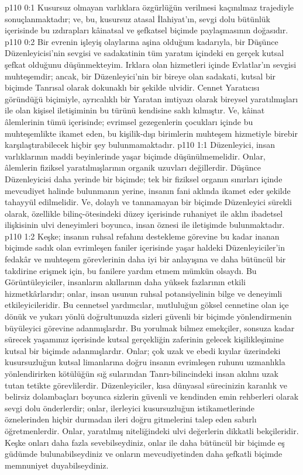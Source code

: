\vs p110 0:1 Kusursuz olmayan varlıklara özgürlüğün verilmesi kaçınılmaz trajediyle sonuçlanmaktadır; ve, bu, kusursuz atasal İlahiyat’ın, sevgi dolu bütünlük içerisinde bu ızdırapları kâinatsal ve şefkatsel biçimde paylaşmasının doğasıdır.
\vs p110 0:2 Bir evrenin işleyiş olaylarına aşina olduğum kadarıyla, bir Düşünce Düzenleyicisi’nin sevgisi ve sadakatinin tüm yaratım içindeki en gerçek kutsal şefkat olduğunu düşünmekteyim. Irklara olan hizmetleri içinde Evlatlar’ın sevgisi muhteşemdir; ancak, bir Düzenleyici’nin bir bireye olan sadakati, kutsal bir biçimde Tanrısal olarak dokunaklı bir şekilde ulvidir. Cennet Yaratıcısı göründüğü biçimiyle, ayrıcalıklı bir Yaratan imtiyazı olarak bireysel yaratılmışları ile olan kişisel iletişiminin bu türünü kendisine saklı kılmıştır. Ve, kâinat âlemlerinin tümü içerisinde; evrimsel gezegenlerin çocukları içinde bu muhteşemlikte ikamet eden, bu kişilik\hyp{}dışı birimlerin muhteşem hizmetiyle birebir karşılaştırabilecek hiçbir şey bulunmamaktadır.
\vs p110 1:1 Düzenleyici, insan varlıklarının maddi beyinlerinde yaşar biçimde düşünülmemelidir. Onlar, âlemlerin fiziksel yaratılmışlarının organik uzuvları değillerdir. Düşünce Düzenleyicisi daha yerinde bir biçimde; tek bir fiziksel organın sınırları içinde mevcudiyet halinde bulunmanın yerine, insanın fani aklında ikamet eder şekilde tahayyül edilmelidir. Ve, dolaylı ve tanınamayan bir biçimde Düzenleyici sürekli olarak, özellikle bilinç\hyp{}ötesindeki düzey içerisinde ruhaniyet ile aklın ibadetsel ilişkisinin ulvi deneyimleri boyunca, insan öznesi ile iletişimde bulunmaktadır.
\vs p110 1:2 Keşke; insanın ruhsal refahını destekleme görevine bu kadar inanan biçimde sadık olan evrimleşen faniler içerisinde yaşar haldeki Düzenleyiciler’in fedakâr ve muhteşem görevlerinin daha iyi bir anlayışına ve daha bütüncül bir takdirine erişmek için, bu fanilere yardım etmem mümkün olsaydı. Bu Görüntüleyiciler, insanların akıllarının daha yüksek fazlarının etkili hizmetkârlarıdır; onlar, insan usunun ruhsal potansiyelinin bilge ve deneyimli etkileyicileridir. Bu cennetsel yardımcılar, mutluluğun göksel cennetine olan içe dönük ve yukarı yönlü doğrultunuzda sizleri güvenli bir biçimde yönlendirmenin büyüleyici görevine adanmışlardır. Bu yorulmak bilmez emekçiler, sonsuza kadar sürecek yaşamınız içerisinde kutsal gerçekliğin zaferinin gelecek kişilikleşimine kutsal bir biçimde adanmışlardır. Onlar; çok uzak ve ebedi kıyılar üzerindeki kusursuzluğun kutsal limanlarına doğru insanın evrimleşen ruhunu uzmanlıkla yönlendirirken kötülüğün sığ sularından Tanrı\hyp{}bilincindeki insan akılını uzak tutan tetikte görevlilerdir. Düzenleyiciler, kısa dünyasal sürecinizin karanlık ve belirsiz dolambaçları boyunca sizlerin güvenli ve kendinden emin rehberleri olarak sevgi dolu önderlerdir; onlar, ilerleyici kusursuzluğun istikametlerinde öznelerinden hiçbir durmadan ileri doğru gitmelerini talep eden sabırlı öğretmenlerdir. Onlar, yaratılmış niteliğindeki ulvi değerlerin dikkatli bekçileridir. Keşke onları daha fazla sevebilseydiniz, onlar ile daha bütüncül bir biçimde eş güdümde bulunabilseydiniz ve onların mevcudiyetinden daha şefkatli biçimde memnuniyet duyabilseydiniz.

